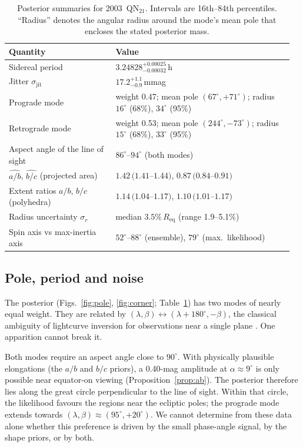 \documentclass[11pt,a4paper]{article}
\theoremstyle{remark}
\newcommand{\Req}{R_{\mathrm{eq}}}
\begin{document}
\begin{table}[t]
\centering
\caption{Posterior summaries for 2003~QN$_{21}$. Intervals are 16th--84th percentiles. ``Radius''
denotes the angular radius around the mode's mean pole that encloses the stated posterior mass.}
\label{tab:results}
\small
\begin{tabular}{@{}>{\raggedright\arraybackslash}p{0.36\linewidth}>{\raggedright\arraybackslash}p{0.60\linewidth}@{}}
\toprule
Quantity & Value\\
\midrule
Sidereal period & $3.24828^{+0.00025}_{-0.00032}$\,h\\
Jitter $\sigma_{\mathrm{jit}}$ & $17.2^{+1.1}_{-0.9}$\,mmag\\
Prograde mode & weight 0.47; mean pole $(67^\circ,+71^\circ)$; radius $16^\circ$ (68\%), $34^\circ$ (95\%)\\
Retrograde mode & weight 0.53; mean pole $(244^\circ,-73^\circ)$; radius $15^\circ$ (68\%), $33^\circ$ (95\%)\\
Aspect angle of the line of sight & $86^\circ$--$94^\circ$ (both modes)\\
$\widehat{a/b}$, $\widehat{b/c}$ (projected area) & $1.42\,(1.41$--$1.44)$, $0.87\,(0.84$--$0.91)$\\
Extent ratios $a/b$, $b/c$ (polyhedra) & $1.14\,(1.04$--$1.17)$, $1.10\,(1.01$--$1.17)$\\
Radius uncertainty $\sigma_r$ & median $3.5\%\,\Req$ (range 1.9--5.1\%)\\
Spin axis vs max-inertia axis & $52^\circ$--$88^\circ$ (ensemble), $79^\circ$ (max.\ likelihood)\\
\bottomrule
\end{tabular}
\end{table}

\subsection{Pole, period and noise}
The posterior (Figs.~\ref{fig:pole}, \ref{fig:corner}; Table~\ref{tab:results}) has two modes of
nearly equal weight. They are related by $(\lambda,\beta)\leftrightarrow(\lambda+180^\circ,-\beta)$,
the classical ambiguity of lightcurve inversion for observations near a single plane
\citep{kaasalainen2006}. One apparition cannot break it.

Both modes require an aspect angle close to $90^\circ$. With physically plausible elongations (the
$a/b$ and $b/c$ priors), a 0.40-mag amplitude at $\alpha\approx9^\circ$ is only possible near
equator-on viewing (Proposition~\ref{prop:ab}). The posterior therefore lies along the great circle
perpendicular to the line of sight. Within that circle, the likelihood favours the regions near the
ecliptic poles; the prograde mode extends towards $(\lambda,\beta)\approx(95^\circ,+20^\circ)$. We
cannot determine from these data alone whether this preference is driven by the small phase-angle
signal, by the shape priors, or by both.
\end{document}
